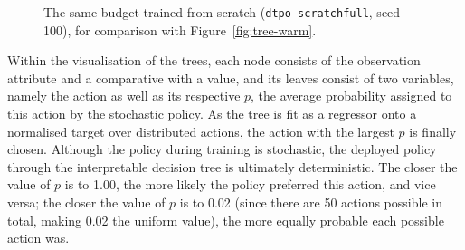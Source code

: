 \begin{figure}[H]
\centering

\caption{The same budget trained from scratch
(\texttt{dtpo-scratchfull}, seed 100), for comparison with
Figure~\ref{fig:tree-warm}.}
\label{fig:tree-scratch}
\end{figure}



Within the visualisation of the trees, each node consists of the observation attribute and a comparative with a value, and its leaves consist of two variables, namely the action as well as its respective $p$, the average probability assigned to this action by the stochastic policy. As the tree is fit as a regressor onto a normalised target over distributed actions, the action with the largest $p$ is finally chosen. Although the policy during training is stochastic, the deployed policy through the interpretable decision tree is ultimately deterministic. The closer the value of $p$ is to 1.00, the more likely the policy preferred this action, and vice versa; the closer the value of $p$ is to 0.02 (since there are 50 actions possible in total, making 0.02 the uniform value), the more equally probable each possible action was. 


